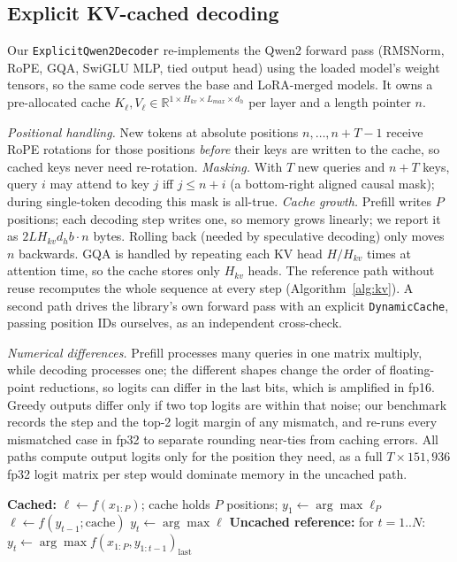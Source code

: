 \documentclass[conference]{IEEEtran}
\begin{document}
\subsection{Explicit KV-cached decoding}
Our \texttt{ExplicitQwen2Decoder} re-implements the Qwen2 forward pass (RMSNorm, RoPE, GQA, SwiGLU MLP, tied output head) using the loaded model's weight tensors, so the same code serves the base and LoRA-merged models. It owns a pre-allocated cache $K_\ell, V_\ell \in \mathbb{R}^{1\times H_{kv}\times L_{max}\times d_h}$ per layer and a length pointer $n$.

\emph{Positional handling.} New tokens at absolute positions $n,\dots,n{+}T{-}1$ receive RoPE rotations for those positions \emph{before} their keys are written to the cache, so cached keys never need re-rotation. \emph{Masking.} With $T$ new queries and $n{+}T$ keys, query $i$ may attend to key $j$ iff $j \le n+i$ (a bottom-right aligned causal mask); during single-token decoding this mask is all-true. \emph{Cache growth.} Prefill writes $P$ positions; each decoding step writes one, so memory grows linearly; we report it as $2LH_{kv}d_h b \cdot n$ bytes. Rolling back (needed by speculative decoding) only moves $n$ backwards. GQA is handled by repeating each KV head $H/H_{kv}$ times at attention time, so the cache stores only $H_{kv}$ heads. The reference path without reuse recomputes the whole sequence at every step (Algorithm~\ref{alg:kv}). A second path drives the library's own forward pass with an explicit \texttt{DynamicCache}, passing position IDs ourselves, as an independent cross-check.

\emph{Numerical differences.} Prefill processes many queries in one matrix multiply, while decoding processes one; the different shapes change the order of floating-point reductions, so logits can differ in the last bits, which is amplified in fp16. Greedy outputs differ only if two top logits are within that noise; our benchmark records the step and the top-2 logit margin of any mismatch, and re-runs every mismatched case in fp32 to separate rounding near-ties from caching errors. All paths compute output logits only for the position they need, as a full $T\times 151{,}936$ fp32 logit matrix per step would dominate memory in the uncached path.

\begin{algorithm}[t]\caption{Greedy decoding with and without cache reuse}\label{alg:kv}
\begin{algorithmic}[1]
\State \textbf{Cached:} $\ell \gets f(x_{1:P})$; cache holds $P$ positions; $y_1\gets\arg\max \ell_P$
 \State $\ell \gets f(y_{t-1}; \text{cache})$ 
\State $y_t \gets \arg\max \ell$ \EndFor
\State \textbf{Uncached reference:} for $t=1..N$: $y_t\gets\arg\max f(x_{1:P}, y_{1:t-1})_{\text{last}}$
\end{algorithmic}\end{algorithm}
\end{document}

